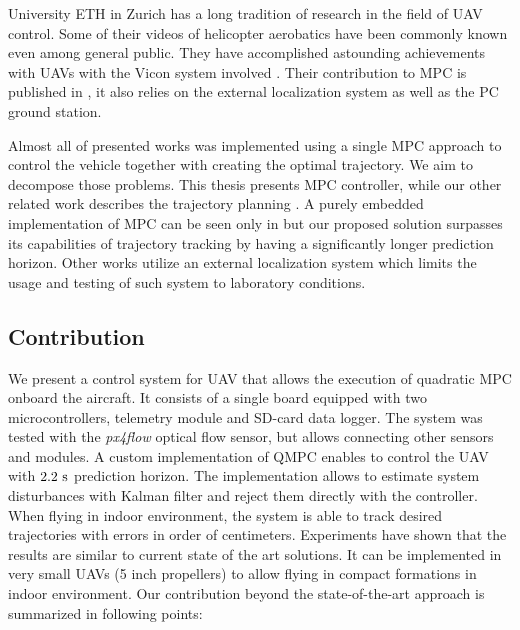 University ETH in Zurich has a long tradition of research in the field of UAV control. Some of their videos of helicopter aerobatics have been commonly known even among general public. They have accomplished astounding achievements with UAVs with the Vicon system involved \citep{brescianini2013polearobatics, Augugliaro2013buildingstructures}. Their contribution to MPC is published in \citep{ethMueller2013mpc}, it also relies on the external localization system as well as the PC ground station.

Almost all of presented works was implemented using a single MPC approach to control the vehicle together with creating the optimal trajectory. We aim to decompose those problems. This thesis presents MPC controller, while our other related work describes the trajectory planning \citep{saska_baca2014, saska2014formations}. A purely embedded implementation of MPC can be seen only in \citep{alexis2014rmpc, papachristos2013} but our proposed solution surpasses its capabilities of trajectory tracking by having a significantly longer prediction horizon. Other works \citep{bangura2014realtimempc, bouffard2012dtic, bouffard2012learning, ethMueller2013mpc, suzuki2014collision} utilize an external localization system which limits the usage and testing of such system to laboratory conditions. 

\subsection{Contribution}

We present a control system for UAV that allows the execution of quadratic MPC onboard the aircraft. It consists of a single board equipped with two microcontrollers, telemetry module and SD-card data logger. The system was tested with the \textit{px4flow} optical flow sensor, but allows connecting other sensors and modules. A custom implementation of QMPC enables to control the UAV with $2.2~\mathrm{s}$ prediction horizon. The implementation allows to estimate system disturbances with Kalman filter and reject them directly with the controller. When flying in indoor environment, the system is able to track desired trajectories with errors in order of centimeters. Experiments have shown that the results are similar to current state of the art solutions. It can be implemented in very small UAVs (5 inch propellers) to allow flying in compact formations in indoor environment. Our contribution beyond the state-of-the-art approach is summarized in following points:

